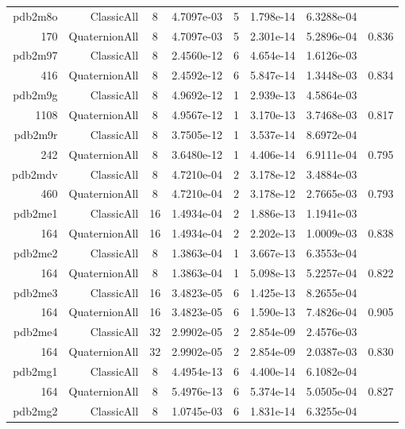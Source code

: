 \begin{xltabular}{\textwidth}{r|rcS[table-format=1.4e+2]cS[table-format=1.3e+2]S[table-format=1.4e+2]S[table-format=-1.3]}
pdb2m8o & ClassicAll & 8 & 4.7097e-03 & 5 & 1.798e-14 & 6.3288e-04 & \\
170 & QuaternionAll & 8 & 4.7097e-03 & 5 & 2.301e-14 & 5.2896e-04 & 0.836\\  \addlinespace
pdb2m97 & ClassicAll & 8 & 2.4560e-12 & 6 & 4.654e-14 & 1.6126e-03 & \\
416 & QuaternionAll & 8 & 2.4592e-12 & 6 & 5.847e-14 & 1.3448e-03 & 0.834\\  \addlinespace
pdb2m9g & ClassicAll & 8 & 4.9692e-12 & 1 & 2.939e-13 & 4.5864e-03 & \\
1108 & QuaternionAll & 8 & 4.9567e-12 & 1 & 3.170e-13 & 3.7468e-03 & 0.817\\  \addlinespace
pdb2m9r & ClassicAll & 8 & 3.7505e-12 & 1 & 3.537e-14 & 8.6972e-04 & \\
242 & QuaternionAll & 8 & 3.6480e-12 & 1 & 4.406e-14 & 6.9111e-04 & 0.795\\  \addlinespace
pdb2mdv & ClassicAll & 8 & 4.7210e-04 & 2 & 3.178e-12 & 3.4884e-03 & \\
460 & QuaternionAll & 8 & 4.7210e-04 & 2 & 3.178e-12 & 2.7665e-03 & 0.793\\  \addlinespace
pdb2me1 & ClassicAll & 16 & 1.4934e-04 & 2 & 1.886e-13 & 1.1941e-03 & \\
164 & QuaternionAll & 16 & 1.4934e-04 & 2 & 2.202e-13 & 1.0009e-03 & 0.838\\  \addlinespace
pdb2me2 & ClassicAll & 8 & 1.3863e-04 & 1 & 3.667e-13 & 6.3553e-04 & \\
164 & QuaternionAll & 8 & 1.3863e-04 & 1 & 5.098e-13 & 5.2257e-04 & 0.822\\  \addlinespace
pdb2me3 & ClassicAll & 16 & 3.4823e-05 & 6 & 1.425e-13 & 8.2655e-04 & \\
164 & QuaternionAll & 16 & 3.4823e-05 & 6 & 1.590e-13 & 7.4826e-04 & 0.905\\  \addlinespace
pdb2me4 & ClassicAll & 32 & 2.9902e-05 & 2 & 2.854e-09 & 2.4576e-03 & \\
164 & QuaternionAll & 32 & 2.9902e-05 & 2 & 2.854e-09 & 2.0387e-03 & 0.830\\  \addlinespace
pdb2mg1 & ClassicAll & 8 & 4.4954e-13 & 6 & 4.400e-14 & 6.1082e-04 & \\
164 & QuaternionAll & 8 & 5.4976e-13 & 6 & 5.374e-14 & 5.0505e-04 & 0.827\\  \addlinespace
pdb2mg2 & ClassicAll & 8 & 1.0745e-03 & 6 & 1.831e-14 & 6.3255e-04 & \\

\end{xltabular}
